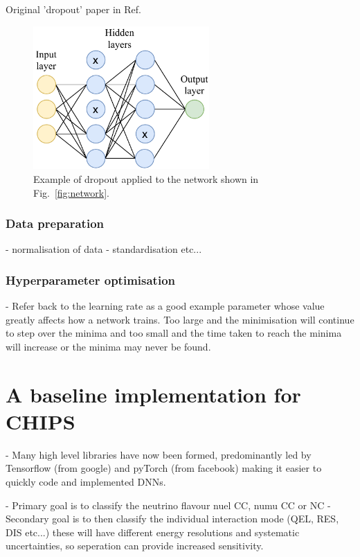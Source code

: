 Original 'dropout' paper in Ref.~\cite{hinton2012}
\begin{figure} %
    \includegraphics[width=0.6\textwidth]{diagrams/7-cvn/dropout.pdf}
    \caption[dropout short]
    {Example of dropout applied to the network shown in Fig.~\ref{fig:network}.}
    \label{fig:dropout}
\end{figure}

\subsubsection*{Data preparation}

- normalisation of data
- standardisation etc...

\subsubsection*{Hyperparameter optimisation}

- Refer back to the learning rate as a good example
parameter whose value greatly affects how a network trains. Too large and the minimisation will
continue to step over the minima and too small and the time taken to reach the minima will
increase or the minima may never be found.

\section{A baseline implementation for CHIPS} %
\label{sec:cvn_baseline} %

- Many high level libraries have now been formed, predominantly led by Tensorflow (from google)
and pyTorch (from facebook) making it easier to quickly code and implemented DNNs.

- Primary goal is to classify the neutrino flavour nuel CC, numu CC or NC
- Secondary goal is to then classify the individual interaction mode (QEL, RES, DIS etc...) these
will have different energy resolutions and systematic uncertainties, so seperation can provide
increased sensitivity.

